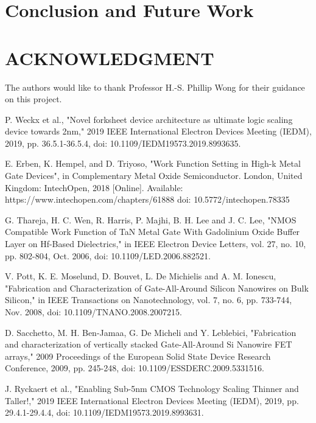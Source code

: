 \documentclass[letterpaper, 12 pt, conference]{ieeeconf}  %
\begin{document}
\section{Conclusion and Future Work}



\section*{ACKNOWLEDGMENT}

The authors would like to thank Professor H.-S. Phillip Wong for their guidance on this project.



\begin{thebibliography}{99}


 P. Weckx et al., "Novel forksheet device architecture as ultimate logic scaling device towards 2nm," 2019 IEEE International Electron Devices Meeting (IEDM), 2019, pp. 36.5.1-36.5.4, doi: 10.1109/IEDM19573.2019.8993635.


 E. Erben, K. Hempel, and D. Triyoso, "Work Function Setting in High-k Metal Gate Devices", in Complementary Metal Oxide Semiconductor. London, United Kingdom: IntechOpen, 2018 [Online]. Available: https://www.intechopen.com/chapters/61888 doi: 10.5772/intechopen.78335

 G. Thareja, H. C. Wen, R. Harris, P. Majhi, B. H. Lee and J. C. Lee, "NMOS Compatible Work Function of TaN Metal Gate With Gadolinium Oxide Buffer Layer on Hf-Based Dielectrics," in IEEE Electron Device Letters, vol. 27, no. 10, pp. 802-804, Oct. 2006, doi: 10.1109/LED.2006.882521.

 V. Pott, K. E. Moselund, D. Bouvet, L. De Michielis and A. M. Ionescu, "Fabrication and Characterization of Gate-All-Around Silicon Nanowires on Bulk Silicon," in IEEE Transactions on Nanotechnology, vol. 7, no. 6, pp. 733-744, Nov. 2008, doi: 10.1109/TNANO.2008.2007215.

 D. Sacchetto, M. H. Ben-Jamaa, G. De Micheli and Y. Leblebici, "Fabrication and characterization of vertically stacked Gate-All-Around Si Nanowire FET arrays," 2009 Proceedings of the European Solid State Device Research Conference, 2009, pp. 245-248, doi: 10.1109/ESSDERC.2009.5331516.

 J. Ryckaert et al., "Enabling Sub-5nm CMOS Technology Scaling Thinner and Taller!," 2019 IEEE International Electron Devices Meeting (IEDM), 2019, pp. 29.4.1-29.4.4, doi: 10.1109/IEDM19573.2019.8993631.



\end{thebibliography}
\end{document}
